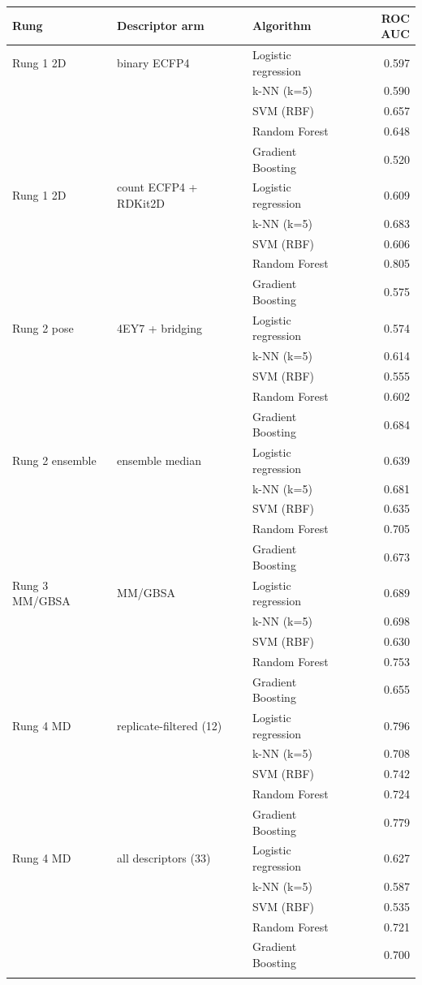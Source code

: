 \begin{tabular}{lllr}
\toprule
Rung & Descriptor arm & Algorithm & \framingC{} ROC AUC \\
\midrule
Rung 1 2D & binary ECFP4 & Logistic regression & 0.597 \\
 &  & k-NN (k=5) & 0.590 \\
 &  & SVM (RBF) & 0.657 \\
 &  & Random Forest & 0.648 \\
 &  & Gradient Boosting & 0.520 \\
\addlinespace
Rung 1 2D & count ECFP4 + RDKit2D & Logistic regression & 0.609 \\
 &  & k-NN (k=5) & 0.683 \\
 &  & SVM (RBF) & 0.606 \\
 &  & Random Forest & 0.805 \\
 &  & Gradient Boosting & 0.575 \\
\addlinespace
Rung 2 pose & 4EY7 + bridging & Logistic regression & 0.574 \\
 &  & k-NN (k=5) & 0.614 \\
 &  & SVM (RBF) & 0.555 \\
 &  & Random Forest & 0.602 \\
 &  & Gradient Boosting & 0.684 \\
\addlinespace
Rung 2 ensemble & ensemble median & Logistic regression & 0.639 \\
 &  & k-NN (k=5) & 0.681 \\
 &  & SVM (RBF) & 0.635 \\
 &  & Random Forest & 0.705 \\
 &  & Gradient Boosting & 0.673 \\
\addlinespace
Rung 3 MM/GBSA & MM/GBSA & Logistic regression & 0.689 \\
 &  & k-NN (k=5) & 0.698 \\
 &  & SVM (RBF) & 0.630 \\
 &  & Random Forest & 0.753 \\
 &  & Gradient Boosting & 0.655 \\
\addlinespace
Rung 4 MD & replicate-filtered (12) & Logistic regression & 0.796 \\
 &  & k-NN (k=5) & 0.708 \\
 &  & SVM (RBF) & 0.742 \\
 &  & Random Forest & 0.724 \\
 &  & Gradient Boosting & 0.779 \\
\addlinespace
Rung 4 MD & all descriptors (33) & Logistic regression & 0.627 \\
 &  & k-NN (k=5) & 0.587 \\
 &  & SVM (RBF) & 0.535 \\
 &  & Random Forest & 0.721 \\
 &  & Gradient Boosting & 0.700 \\
\addlinespace
\bottomrule
\end{tabular}
